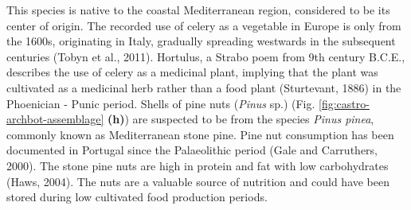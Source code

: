 \documentclass[review]{elsarticle} %
\begin{document}
This species is native to the coastal Mediterranean region, considered to be its center of origin. The recorded use of celery as a vegetable in Europe is only from the 1600s, originating in Italy, gradually spreading westwards in the subsequent centuries (Tobyn et al., 2011). Hortulus, a Strabo poem from 9th century B.C.E., describes the use of celery as a medicinal plant, implying that the plant was cultivated as a medicinal herb rather than a food plant (Sturtevant, 1886) in the Phoenician - Punic period. Shells of pine nuts (\emph{Pinus} sp.) (Fig. \ref{fig:castro-archbot-assemblage} \textbf{(h)}) are suspected to be from the species \emph{Pinus pinea}, commonly known as Mediterranean stone pine. Pine nut consumption has been documented in Portugal since the Palaeolithic period (Gale and Carruthers, 2000). The stone pine nuts are high in protein and fat with low carbohydrates (Haws, 2004). The nuts are a valuable source of nutrition and could have been stored during low cultivated food production periods.
\end{document}
